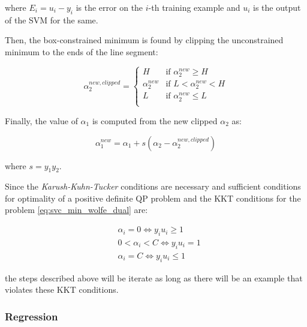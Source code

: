 where $E_i = u_i - y_i$ is the error on the $i$-th training example and $u_i$ is the output of the SVM for the same.

Then, the box-constrained minimum is found by clipping the unconstrained minimum to the ends of the line segment:

\begin{equation} \label{eq:smo_a_2_new_clipped}
    \alpha_2^{new,clipped} =
        \begin{cases}
            H & \text{if } \alpha_2^{new} \geq H \\
            \alpha_2^{new} & \text{if } L < \alpha_2^{new} < H \\
            L & \text{if } \alpha_2^{new} \leq L \\
        \end{cases}
\end{equation}

Finally, the value of $\alpha_1$ is computed from the new clipped $\alpha_2$ as:

\begin{equation} \label{eq:smo_a_1_new}
	\alpha_1^{new} = \alpha_1 + s (\alpha_2 - \alpha_2^{new,clipped})
\end{equation}

where $s = y_1 y_2$.

Since the \emph{Karush-Kuhn-Tucker} conditions are necessary and sufficient conditions for optimality of a positive definite QP problem and the KKT conditions for the problem \ref{eq:svc_min_wolfe_dual} are:

\begin{equation} \label{eq:smo_kkt}
	\begin{aligned}
		& \alpha_i = 0 \Leftrightarrow y_i u_i \geq 1 \\
		& 0 < \alpha_i < C \Leftrightarrow y_i u_i = 1 \\
		& \alpha_i = C \Leftrightarrow y_i u_i \leq 1
	\end{aligned}
\end{equation}

the steps described above will be iterate as long as there will be an example that violates these KKT conditions.

\subsubsection{Regression}